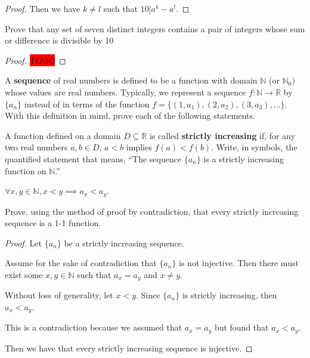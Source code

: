\documentclass[12 pt]{exam}
\begin{document}
\begin{questions}
\begin{solution}
\begin{proof}
Then we have $k \ne l$ such that $10 | a^k - a^l$.
\end{proof}\end{solution}

 


\question Prove that any set of seven distinct integers contains a pair of integers whose sum or difference is divisible by 10

\begin{solution}\begin{proof}
\colorbox{red}{TODO}
\end{proof}\end{solution}

 


A \textbf{sequence} of real numbers is defined to be a function with domain $\mathbb{N}$ (or $\mathbb{N}_0)$ whose values are real numbers. Typically, we represent a sequence $f:\mathbb{N}\rightarrow \mathbb{R}$ by $\{a_n\}$ instead of in terms of the function $f=\{ (1,a_1), (2,a_2), (3,a_3), \ldots\}$. With this definition in mind, prove each of the following statements.


\question A function defined on a domain $D\subseteq \mathbb{R}$ is called \textbf{strictly increasing} if, for any two real numbers $a,b\in D$, $a<b$ implies $f(a)<f(b)$. Write, in symbols, the quantified statement that means, ``The sequence $\{a_n\}$ is a strictly increasing function on $\mathbb{N}$.''

\begin{solution}
$\forall x, y \in \mathbb{N}, x < y \implies a_x < a_y$.
\end{solution}

 
\question Prove, using the method of proof by contradiction, that every strictly increasing sequence is a 1-1 function.

\begin{solution}\begin{proof}
Let $\{a_n\}$ be a strictly increasing sequence.

Assume for the sake of contradiction that $\{a_n\}$ is not injective. Then there must exist
some $x, y \in \mathbb{N}$ such that $a_x = a_y$ and $x \ne y$.

Without loss of generality, let $x < y$. Since $\{a_n\}$ is strictly increasing, then $a_x < a_y$.

This is a contradiction because we assumed that $a_x = a_y$ but found that $a_x < a_y$.

Then we have that every strictly increasing sequence is injective.
\end{proof}\end{solution}


\end{questions}
\end{document}
